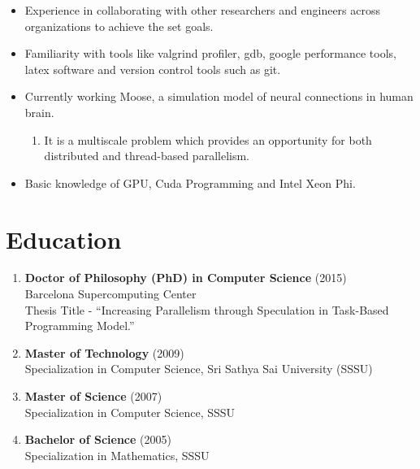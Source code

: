 \documentclass[margin]{res}
\begin{document}
\begin{resume}
\begin{itemize}
	   \item Experience in collaborating with other researchers and engineers across organizations to achieve the set goals.
	   \item Familiarity with tools like valgrind profiler, gdb, google performance tools, latex software and version control tools such as git.
%
	   \item Currently working Moose, a simulation model of neural connections in human brain.
			 \begin{enumerate}
				    \item It is a multiscale problem which provides an opportunity for both distributed and thread-based parallelism.
			 \end{enumerate}
%	   
	   \item Basic knowledge of GPU, Cuda Programming and Intel Xeon Phi. 
%
  \end{itemize}

\section{Education} 
%
\begin{enumerate}
	   \item {\bf Doctor of Philosophy (PhD)  in Computer Science } (2015) \\
		Barcelona Supercomputing Center \\
		Thesis Title - \enquote{Increasing Parallelism through Speculation in Task-Based Programming Model.}\\
%
	   \item {\bf Master of Technology }(2009) \\
		Specialization in Computer Science, Sri Sathya Sai University (SSSU) \\
%
	   \item {\bf Master of Science }(2007) \\
		Specialization in Computer Science, SSSU
%
	   \item {\bf Bachelor of Science} (2005) \\
		Specialization in Mathematics, SSSU 
%
\end{enumerate}
%

\end{resume}
\end{document}
